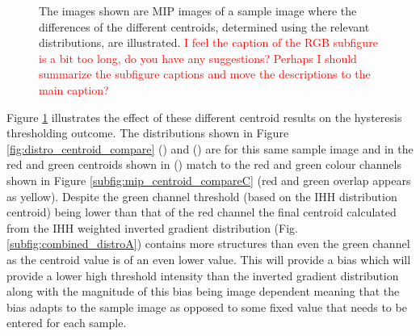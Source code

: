 \begin{figure}
    \caption{The images shown are MIP images of a sample image where the differences of the different centroids, determined using the relevant distributions, are illustrated.\label{fig:centroid_weighting_mips} \textcolor{red}{I feel the caption of the RGB subfigure is a bit too long, do you have any suggestions? Perhaps I should summarize the subfigure captions and move the descriptions to the main caption?}}
\end{figure}
Figure \ref{fig:centroid_weighting_mips} illustrates the effect of these different centroid results on the hysteresis thresholding outcome. The distributions shown in Figure \ref{fig:distro_centroid_compare} () and () are for this same sample image and in the red and green centroids shown in () match to the red and green colour channels shown in Figure \ref{subfig:mip_centroid_compareC} (red and green overlap appears as yellow). Despite the green channel threshold (based on the IHH distribution centroid) being lower than that of the red channel the final centroid calculated from the IHH weighted inverted gradient distribution (Fig. \ref{subfig:combined_distroA}) contains more structures than even the green channel as the centroid value is of an even lower value. This will provide a bias which will provide a lower high threshold intensity than the inverted gradient distribution along with the magnitude of this bias being image dependent meaning that the bias adapts to the sample image as opposed to some fixed value that needs to be entered for each sample.

